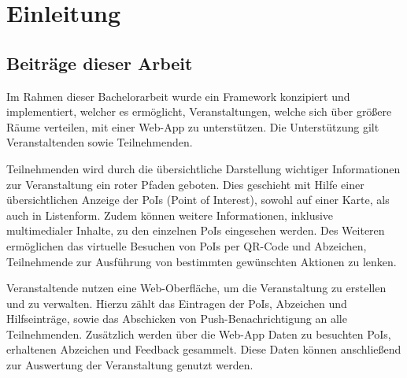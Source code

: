 \chapter{Einleitung}

%
%
%



\section{Beiträge dieser Arbeit}

Im Rahmen dieser Bachelorarbeit wurde ein Framework konzipiert und
implementiert, welcher es ermöglicht, Veranstaltungen, welche sich über größere
Räume verteilen, mit einer Web-App zu unterstützen. Die Unterstützung gilt
Veranstaltenden sowie Teilnehmenden.

Teilnehmenden wird durch die übersichtliche Darstellung wichtiger Informationen
zur Veranstaltung ein roter Pfaden geboten. Dies geschieht mit Hilfe einer
übersichtlichen Anzeige der PoIs (Point of Interest), sowohl auf einer Karte,
als auch in Listenform. Zudem können weitere Informationen, inklusive
multimedialer Inhalte, zu den einzelnen PoIs eingesehen werden. Des Weiteren
ermöglichen das virtuelle Besuchen von PoIs per QR-Code und Abzeichen,
Teilnehmende zur Ausführung von bestimmten gewünschten Aktionen zu lenken.

Veranstaltende nutzen eine Web-Oberfläche, um die Veranstaltung zu erstellen und
zu verwalten. Hierzu zählt das Eintragen der PoIs, Abzeichen und Hilfseinträge,
sowie das Abschicken von Push-Benachrichtigung an alle Teilnehmenden. Zusätzlich
werden über die Web-App Daten zu besuchten PoIs, erhaltenen Abzeichen und
Feedback gesammelt. Diese Daten können anschließend zur Auswertung der
Veranstaltung genutzt werden.

